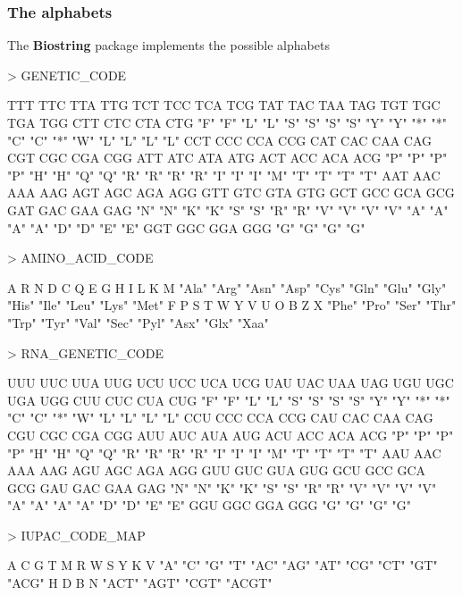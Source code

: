 \documentclass{beamer}
\begin{document}
\begin{frame}[fragile]
\frametitle{The alphabets}
  \bit
      \item The \textbf{Biostring} package implements the possible alphabets
        \begin{uncoverenv}
\begin{Schunk}
\begin{Sinput}
> GENETIC_CODE
\end{Sinput}
\begin{Soutput}
TTT TTC TTA TTG TCT TCC TCA TCG TAT TAC TAA TAG TGT TGC TGA TGG CTT CTC CTA CTG 
"F" "F" "L" "L" "S" "S" "S" "S" "Y" "Y" "*" "*" "C" "C" "*" "W" "L" "L" "L" "L" 
CCT CCC CCA CCG CAT CAC CAA CAG CGT CGC CGA CGG ATT ATC ATA ATG ACT ACC ACA ACG 
"P" "P" "P" "P" "H" "H" "Q" "Q" "R" "R" "R" "R" "I" "I" "I" "M" "T" "T" "T" "T" 
AAT AAC AAA AAG AGT AGC AGA AGG GTT GTC GTA GTG GCT GCC GCA GCG GAT GAC GAA GAG 
"N" "N" "K" "K" "S" "S" "R" "R" "V" "V" "V" "V" "A" "A" "A" "A" "D" "D" "E" "E" 
GGT GGC GGA GGG 
"G" "G" "G" "G" 
\end{Soutput}
\begin{Sinput}
> AMINO_ACID_CODE
\end{Sinput}
\begin{Soutput}
    A     R     N     D     C     Q     E     G     H     I     L     K     M 
"Ala" "Arg" "Asn" "Asp" "Cys" "Gln" "Glu" "Gly" "His" "Ile" "Leu" "Lys" "Met" 
    F     P     S     T     W     Y     V     U     O     B     Z     X 
"Phe" "Pro" "Ser" "Thr" "Trp" "Tyr" "Val" "Sec" "Pyl" "Asx" "Glx" "Xaa" 
\end{Soutput}
\begin{Sinput}
> RNA_GENETIC_CODE
\end{Sinput}
\begin{Soutput}
UUU UUC UUA UUG UCU UCC UCA UCG UAU UAC UAA UAG UGU UGC UGA UGG CUU CUC CUA CUG 
"F" "F" "L" "L" "S" "S" "S" "S" "Y" "Y" "*" "*" "C" "C" "*" "W" "L" "L" "L" "L" 
CCU CCC CCA CCG CAU CAC CAA CAG CGU CGC CGA CGG AUU AUC AUA AUG ACU ACC ACA ACG 
"P" "P" "P" "P" "H" "H" "Q" "Q" "R" "R" "R" "R" "I" "I" "I" "M" "T" "T" "T" "T" 
AAU AAC AAA AAG AGU AGC AGA AGG GUU GUC GUA GUG GCU GCC GCA GCG GAU GAC GAA GAG 
"N" "N" "K" "K" "S" "S" "R" "R" "V" "V" "V" "V" "A" "A" "A" "A" "D" "D" "E" "E" 
GGU GGC GGA GGG 
"G" "G" "G" "G" 
\end{Soutput}
\begin{Sinput}
> IUPAC_CODE_MAP
\end{Sinput}
\begin{Soutput}
     A      C      G      T      M      R      W      S      Y      K      V 
   "A"    "C"    "G"    "T"   "AC"   "AG"   "AT"   "CG"   "CT"   "GT"  "ACG" 
     H      D      B      N 
 "ACT"  "AGT"  "CGT" "ACGT" 
\end{Soutput}
\end{Schunk}
        \end{uncoverenv}
  \eit
\end{frame}
\end{document}
